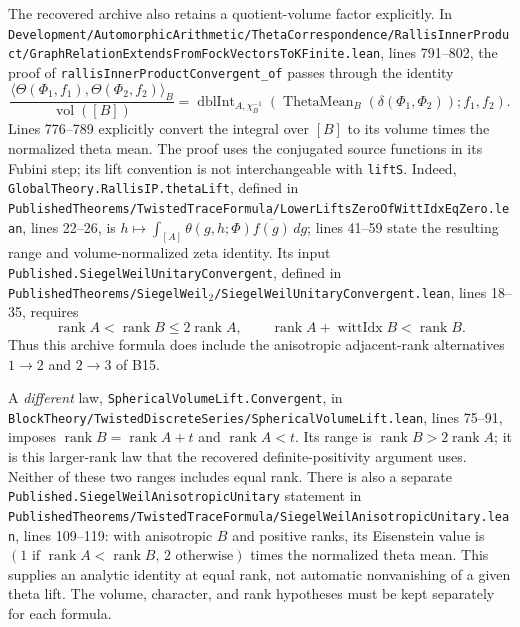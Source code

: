 The recovered archive also retains a quotient-volume factor explicitly. In
\texttt{Development/\allowbreak{}AutomorphicArithmetic/\allowbreak{}ThetaCorrespondence/\allowbreak{}RallisInnerProduct/\allowbreak{}GraphRelationExtendsFromFockVectorsToKFinite.lean}, lines 791--802, the proof of \texttt{rallisInnerProductConvergent\_of} passes through the identity
\[
 \frac{\langle\Theta(\Phi_1,f_1),\Theta(\Phi_2,f_2)\rangle_B}
      {\operatorname{vol}([B])}
 =\operatorname{dblInt}_{A,\chi_B^{-1}}
       (\operatorname{ThetaMean}_B(\delta(\Phi_1,\Phi_2));f_1,f_2).
\]
Lines 776--789 explicitly convert the integral over $[B]$ to its volume times the normalized theta mean. The proof uses the conjugated source functions in its Fubini step; its lift convention is not interchangeable with \texttt{liftS}. Indeed, \texttt{GlobalTheory.RallisIP.thetaLift}, defined in \texttt{PublishedTheorems/\allowbreak{}TwistedTraceFormula/\allowbreak{}LowerLiftsZeroOfWittIdxEqZero.lean}, lines 22--26, is $h\mapsto\int_{[A]}\theta(g,h;\Phi)\overline{f(g)}\,dg$; lines 41--59 state the resulting range and volume-normalized zeta identity. Its input \texttt{Published.SiegelWeilUnitaryConvergent}, defined in \texttt{PublishedTheorems/\allowbreak{}SiegelWeil$_2$/\allowbreak{}SiegelWeilUnitaryConvergent.lean}, lines 18--35, requires
\[
 \operatorname{rank}A<\operatorname{rank}B\leq2\operatorname{rank}A,
 \qquad \operatorname{rank}A+\operatorname{wittIdx}B<\operatorname{rank}B.
\]
Thus this archive formula does include the anisotropic adjacent-rank alternatives $1\to2$ and $2\to3$ of B15.

A \emph{different} law, \texttt{SphericalVolumeLift.Convergent}, in \texttt{BlockTheory/\allowbreak{}TwistedDiscreteSeries/\allowbreak{}SphericalVolumeLift.lean}, lines 75--91, imposes $\operatorname{rank}B=\operatorname{rank}A+t$ and $\operatorname{rank}A<t$. Its range is $\operatorname{rank}B>2\operatorname{rank}A$; it is this larger-rank law that the recovered definite-positivity argument uses. Neither of these two ranges includes equal rank. There is also a separate \texttt{Published.SiegelWeilAnisotropicUnitary} statement in \texttt{PublishedTheorems/\allowbreak{}TwistedTraceFormula/\allowbreak{}SiegelWeilAnisotropicUnitary.lean}, lines 109--119: with anisotropic $B$ and positive ranks, its Eisenstein value is $(1\text{ if }\operatorname{rank}A<\operatorname{rank}B,\,2\text{ otherwise})$ times the normalized theta mean. This supplies an analytic identity at equal rank, not automatic nonvanishing of a given theta lift. The volume, character, and rank hypotheses must be kept separately for each formula.

